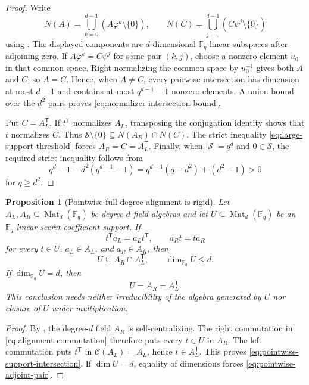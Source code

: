 \documentclass[11pt]{article}
\newtheorem{proposition}[proposition]{Proposition}
\newcommand{\F}{\mathbb F}
\newcommand{\Mat}{\operatorname{Mat}}
\newcommand{\transpose}{\mathsf T}
\begin{document}
\begin{proof}
Write
\[
 N(A)=\bigcup_{k=0}^{d-1}(A\varphi^k\setminus\{0\}),
 \qquad
 N(C)=\bigcup_{j=0}^{d-1}(C\psi^j\setminus\{0\})
\]
using .  The displayed components are
$d$-dimensional $\F_q$-linear subspaces after adjoining zero.  If
$A\varphi^k=C\psi^j$ for some pair $(k,j)$, choose a nonzero element $u_0$
in that common space.  Right-normalizing the common space by $u_0^{-1}$
gives both $A$ and $C$, so $A=C$.  Hence, when $A\ne C$, every pairwise
intersection has dimension at most $d-1$ and contains at most
$q^{d-1}-1$ nonzero elements.  A union bound over the $d^2$ pairs proves
\eqref{eq:normalizer-intersection-bound}.

Put $C=A_L^\transpose$.  If $t^\transpose$ normalizes $A_L$, transposing
the conjugation identity shows that $t$ normalizes $C$.  Thus
$\mathcal S\setminus\{0\}\subseteq N(A_R)\cap N(C)$.  The strict inequality
\eqref{eq:large-support-threshold} forces $A_R=C=A_L^\transpose$.  Finally,
when $|\mathcal S|=q^d$ and $0\in\mathcal S$, the required strict inequality
follows from
\[
 q^d-1-d^2(q^{d-1}-1)
 =q^{d-1}(q-d^2)+(d^2-1)>0
\]
for $q\ge d^2$.
\end{proof}

\begin{proposition}[Pointwise full-degree alignment is rigid]
\label{prop:pointwise-alignment-rigidity}
Let $A_L,A_R\subseteq\Mat_d(\F_q)$ be degree-$d$ field algebras and let
$U\subseteq\Mat_d(\F_q)$ be an $\F_q$-linear secret-coefficient support.
If
\begin{equation}
 t^\transpose a_L=a_Lt^\transpose,
 \qquad
 a_Rt=ta_R                                      \label{eq:alignment-commutation}
\end{equation}
for every $t\in U$, $a_L\in A_L$, and $a_R\in A_R$, then
\begin{equation}
 U\subseteq A_R\cap A_L^\transpose,
 \qquad
 \dim_{\F_q}U\le d.                              \label{eq:pointwise-support-intersection}
\end{equation}
If $\dim_{\F_q}U=d$, then
\begin{equation}
  U=A_R=A_L^\transpose.                            \label{eq:pointwise-adjoint-pair}
\end{equation}
This conclusion needs neither irreducibility of the algebra generated by
$U$ nor closure of $U$ under multiplication.
\end{proposition}

\begin{proof}
By , the degree-$d$ field $A_R$ is
self-centralizing.  The right commutation in
\eqref{eq:alignment-commutation} therefore puts every $t\in U$ in $A_R$.
The left commutation puts $t^\transpose$ in
$\mathcal C(A_L)=A_L$, hence $t\in A_L^\transpose$.  This proves
\eqref{eq:pointwise-support-intersection}.  If $\dim U=d$, equality of
dimensions forces \eqref{eq:pointwise-adjoint-pair}.
\end{proof}
\end{document}
